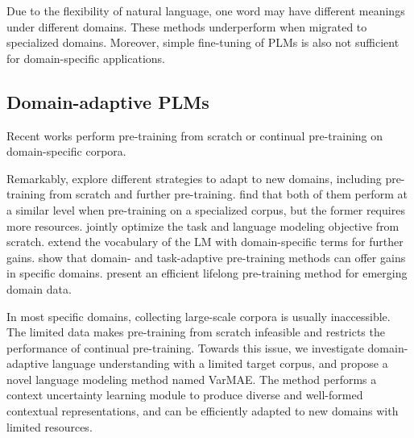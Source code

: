 \documentclass[11pt]{article}
\begin{document}
Due to the flexibility of natural language, one word may have different meanings under different domains. These methods underperform when migrated to specialized domains. Moreover, simple fine-tuning \cite{DBLP:conf/acl/RuderH18,DBLP:conf/seke/HuW20,DBLP:conf/pkdd/WeiHZTZWHH20,hu2022pali} of PLMs is also not sufficient for domain-specific applications.

\subsection{Domain-adaptive PLMs}
Recent works perform pre-training from scratch \cite{ DBLP:journals/health/GuTCLULNGP22,yao2022nlp} or continual pre-training \cite{alsentzer2019publicly,DBLP:journals/corr/abs-1904-05342,DBLP:journals/bioinformatics/LeeYKKKSK20,DBLP:conf/acl/GururanganMSLBD20,DBLP:conf/iclr/WuCLLQH22,DBLP:conf/acl/QinZLL0SZ22} on domain-specific corpora.

Remarkably, \citet{DBLP:conf/emnlp/BeltagyLC19,DBLP:conf/emnlp/ChalkidisFMAA20} 
explore different strategies to adapt to new domains, including pre-training from scratch and further pre-training.
\citet{DBLP:conf/lrec/BoukkouriFLZ22} find that both of them perform at a similar level when pre-training on a specialized corpus, but the former 
requires more resources. 
\citet{yao2022nlp} jointly optimize the task and language modeling objective from scratch.
\citet{DBLP:conf/emnlp/ZhangRSCFFKRSW20,DBLP:conf/emnlp/Tai0DCK20,DBLP:conf/acl/YaoHWDW21} extend the vocabulary of the LM with domain-specific terms for further gains.
\citet{DBLP:conf/acl/GururanganMSLBD20} show that domain- and task-adaptive pre-training methods can offer gains in specific domains.
\citet{DBLP:conf/acl/QinZLL0SZ22} present an efficient lifelong pre-training method for emerging domain data.



In most specific domains, collecting large-scale corpora is usually inaccessible. 
The limited data makes pre-training from scratch infeasible and restricts the performance of continual pre-training.
Towards this issue, we investigate domain-adaptive language understanding with a limited target corpus, and propose a novel language modeling method named VarMAE.
The method performs a context uncertainty learning module to produce diverse and well-formed contextual representations,
and can be efficiently
adapted to new domains with limited resources.
\end{document}
